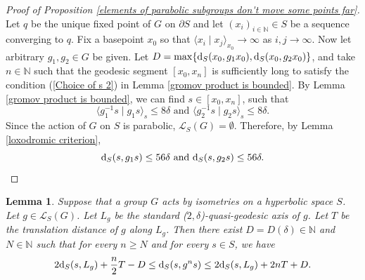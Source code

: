 \documentclass[11pt,letterpaper]{article}
\newcommand{\NN}{\mathbb{N}}
\renewcommand{\d}{{\rm d}}
\renewcommand{\d}{{\rm d}}
\newtheorem{lem}[thm]{Lemma}
\theoremstyle{definition}
\theoremstyle{remark}
\begin{document}
\begin{proof}[Proof of Proposition \ref{elements of parabolic subgroups don't move some points far}]
Let $q$ be the unique fixed point of $G$ on $\partial S$ and let $(x_i)_{i\in \NN} \in S$ be a sequence converging to $q$. Fix a basepoint $x_0$ so that $\langle x_i \mid x_j \rangle_{x_0} \longrightarrow \infty$ as $i, j \longrightarrow \infty.$ Now let arbitrary $g_1, g_2 \in G$ be given. Let $D= \max\{\d_S(x_0, g_1x_0), \d_S(x_0, g_2x_0)\}$, and take $n \in \NN$ such that the geodesic segment $[x_0, x_n]$ is sufficiently long to satisfy the condition (\ref{Choice of s 2}) in Lemma \ref{gromov product is bounded}. By Lemma \ref{gromov product is bounded}, we can find $s \in [x_0, x_n]$, such that
$$
\langle g_1^{-1}s \mid g_1s \rangle_s \leq 8\delta \text{ and } \langle g_2^{-1}s \mid g_2s \rangle_s \leq 8\delta.
$$
Since the action of $G$ on $S$ is parabolic, $\mathcal{L}_S(G)=\emptyset$. Therefore, by Lemma \ref{loxodromic criterion},
$$
\d_S(s,g_1s) \leq 56\delta \text{ and } \d_S(s,g_2s) \leq 56\delta. \qedhere
$$
\end{proof}

\begin{lem}\label{Distance formula for loxodromic elements}
Suppose that a group $G$ acts by isometries on a hyperbolic space $S$. Let $g \in \mathcal{L}_S(G)$. Let $L_g$ be the standard ($2, \delta$)-quasi-geodesic axis of $g$. Let $T$ be the translation distance of $g$ along $L_g$. Then there exist $D=D(\delta) \in \NN$ and $N \in \NN$ such that for every $n \geq N$ and for every $s \in S$, we have
$$
2\d_S(s, L_g)+\frac{n}{2}T - D \leq \d_S(s, g^ns) \leq 2\d_S(s, L_g)+2nT + D.
$$
\end{lem}
\end{document}
